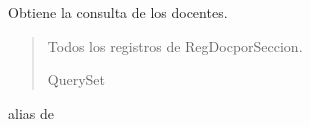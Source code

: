 \documentclass[letterpaper,10pt,spanish]{sphinxmanual}
\begin{document}
\begin{fulllineitems}
\begin{fulllineitems}
\begin{quote}
\begin{description}
\end{description}\end{quote}

\end{fulllineitems}



\begin{fulllineitems}

\pysigstartsignatures
{}
\pysigstopsignatures
\sphinxAtStartPar
Obtiene la consulta de los docentes.
\begin{quote}\begin{description}
\sphinxAtStartPar
Todos los registros de RegDocporSeccion.

\sphinxAtStartPar
QuerySet

\end{description}\end{quote}

\end{fulllineitems}



\begin{fulllineitems}

\pysigstartsignatures
{}
\pysigstopsignatures
\sphinxAtStartPar
alias de 

\end{fulllineitems}



\begin{fulllineitems}

\pysigstartsignatures
{}
\pysigstopsignatures
\end{fulllineitems}


\end{fulllineitems}
\end{document}
